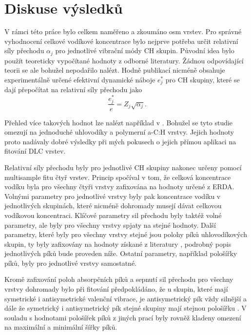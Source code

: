 \chapter{Diskuse výsledků}

V rámci této práce bylo celkem naměřeno a zkoumáno osm vrstev. Pro správné vyhodnocení celkové vodíkové koncentrace bylo nejprve potřeba určit relativní síly přechodu $\alpha_j$ pro jednotlivé vibrační módy CH skupin. Původní idea bylo použít teoreticky vypočítané hodnoty z odborné literatury. Žádnou odpovídající teorii se ale bohužel nepodařilo nalézt. Hodně publikací nicméně obsahuje experimentálně určené efektivní dynamické náboje $e_j^*$ pro CH skupiny, které se dají přepočítat na relativní síly přechodu jako \cite{sumrule2}
\begin{equation}
\frac{e_j^*}{e} = Z_j \sqrt{\alpha_j} \text{.}
\label{efch2str}
\end{equation}

Přehled více takových hodnot lze nalézt například v \cite{Heitz1998}. Bohužel se tyto studie omezují na jednoduché uhlovodíky a polymerní a-C:H vrstvy. Jejich hodnoty proto nadávaly dobré výsledky při mých pokusech o jejich přímou aplikaci na fitování DLC vrstev. 

Relativní síly přechodu byly pro jednotlivé CH skupiny nakonec určeny pomocí multisample fitu čtyř vrstev. Princip spočíval v tom, že celková koncentrace vodíku byla pro všechny čtyři vrstvy zafixována na hodnoty určené z ERDA. Volnými parametry pro jednotlivé vrstvy byly pak koncentrace vodíku v jednotlivých skupinách, které nicméně dohromady musejí dávat celkovou vodíkovou koncentraci. Klíčové parametry sil přechodu byly taktéž volné parametry, ale byly pro všechny vrstvy spjaty na stejné hodnoty. Další parametry, které byly pro všechny vrstvy stejné jsou polohy píků uhlovodíkových skupin, ty byly zafixovány na hodnoty získané z literatury \cite{Robertson2002, Dischler1983, Ristein1998, Zajickova2011}, podrobný popis jednotlivých píků bude proveden níže. Ostatní parametry, například pološířky píků, byly pro jednotlivé vrstvy samostatné.

Kromě zafixování poloh absorpčních píků a sepnutí sil přechodu pro všechny vrstvy dohromady bylo při fitování předpokládáno, že
u skupin, které mají symetrické i antisymetrické valenční vibrace, je antisymetrický pík vždy silnější a dále  že symetrický i antisymetrický pík stejné skupiny mají stejnou pološířku \cite{Heitz1998}. V souladu s hodnotami pološířek píků z jiných prací \cite{Dischler1983, Zajickova2011} byly rovněž kladeny omezení na maximální a minimální šířky píků.

